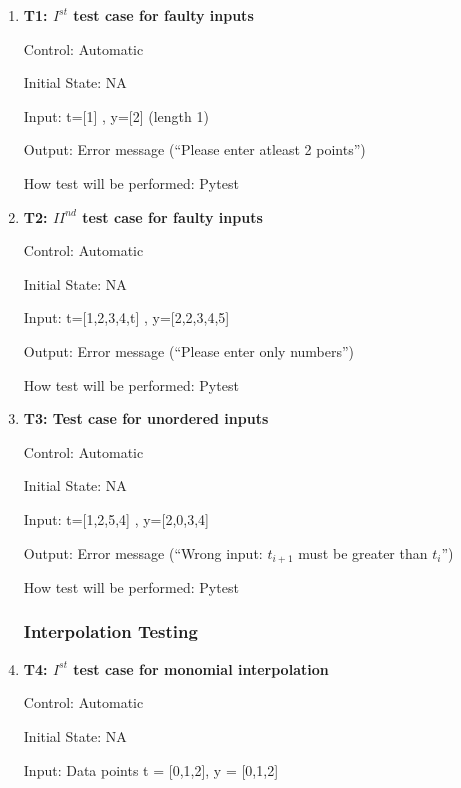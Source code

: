 \documentclass[12pt, titlepage]{article}
\begin{document}
\begin{enumerate}

\item{\textbf{T1: $I^{st}$ test case for faulty inputs}\\}

Control: Automatic

Initial State: NA

Input: t=[1] , y=[2] (length 1)

Output: Error message (``Please enter atleast 2 points'')

How test will be performed: Pytest




\item{\textbf{T2: ${II}^{nd}$ test case for faulty inputs}\\}

Control: Automatic

Initial State: NA

Input: t=[1,2,3,4,t] , y=[2,2,3,4,5] 

Output: Error message (``Please enter only numbers'')

How test will be performed: Pytest




\item{\textbf{T3: Test case for unordered inputs}\\}

Control: Automatic

Initial State: NA

Input: t=[1,2,5,4] , y=[2,0,3,4] 

Output: Error message (``Wrong input: $t_{i+1}$ must be greater than $t_i$'')

How test will be performed: Pytest



\subsubsection{Interpolation Testing}




\item{\textbf{T4: $I^{st}$ test case for monomial interpolation} \\}

Control: Automatic 

Initial State: NA

Input: Data points t = [0,1,2], y = [0,1,2]


\end{enumerate}
\end{document}
